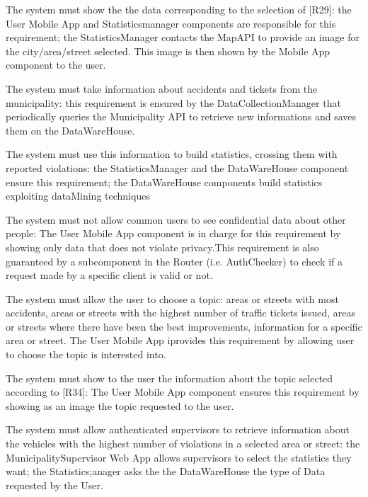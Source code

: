\documentclass[a4paper]{report}
\begin{document}
\begin{enumerate}[start=1,label={[R\arabic*]}]
\item The system must show the the data corresponding to the selection of [R29]: the User Mobile App and Statisticsmanager components are responsible for this requirement; the StatisticsManager contacts the MapAPI to provide an image for the city/area/street selected. This image is then shown by the Mobile App component to the user.
\item The system must take information about accidents and tickets from the municipality: this requirement is ensured by the DataCollectionManager that periodically queries the Municipality API to retrieve new informations and saves them on the DataWareHouse.
\item The system must use this information to build statistics, crossing them with reported violations: the StatisticsManager and the DataWareHouse component ensure this requirement; the DataWareHouse components build statistics exploiting dataMining techniques
\item The system must not allow common users to see confidential data about other people: The User Mobile App component is in charge for this requirement by showing only data that does not violate privacy.This requirement is also guaranteed by a subcomponent in the Router (i.e. AuthChecker) to check if a request made by a specific client is valid or not.
\item The system must allow the user to choose a topic: areas or streets with most accidents, areas or streets with the highest number of traffic tickets issued, areas or streets where there have been the best improvements, information for a specific area or street. The User Mobile App iprovides this requirement by allowing user to choose the topic is interested into.
\item The system must show to the user the information about the topic selected according to [R34]: The User Mobile App component ensures this requirement by showing as an image the topic requested to the user.
\item The system must allow authenticated supervisors to retrieve information about the vehicles with the highest number of violations in a selected area or street: the MunicipalitySupervisor Web App allows supervisors to select the statistics they want; the Statistics;anager asks the the DataWareHouse the type of Data requested by the User.

\end{enumerate}
\end{document}
